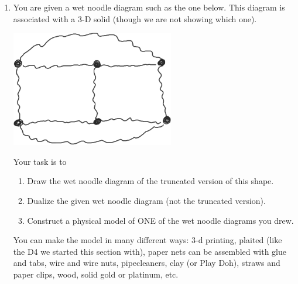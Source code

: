 \begin{enumerate}
\wbnewpage
\item You are given a wet noodle diagram such as the one below. This diagram is associated with a 3-D solid (though we are not showing which one).
\begin{center}
    \includegraphics[height=2in]{images/WND-hamburger}
\end{center}
Your task is to
\begin{enumerate}
	\item Draw the wet noodle diagram of the truncated version of this shape.
	\item Dualize the given wet noodle diagram (not the truncated version).
	\item Construct a physical model of ONE of the wet noodle diagrams you drew.
\end{enumerate}
You can make the model in many different ways:  3-d printing, plaited (like the D4 we started this section with), paper nets can be assembled with glue and tabs, wire and wire nuts, pipecleaners, clay (or Play Doh), straws and paper clips, wood, solid gold or platinum, etc.

\end{enumerate}
